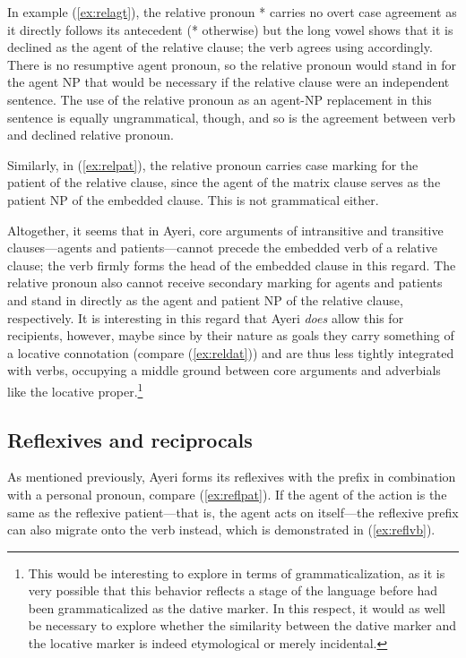 In example (\ref{ex:relagt}), the relative pronoun * carries 
no overt case agreement as it directly follows its antecedent 
(* otherwise) but the long vowel shows that it is declined 
as the agent of the relative clause; the verb agrees using  
accordingly. There is no resumptive agent pronoun, so the relative pronoun 
would stand in for the agent NP that would be necessary if the relative clause 
were an independent sentence. The use of the relative pronoun as an agent-NP 
replacement in this sentence is equally ungrammatical, though, and so is the 
agreement between verb and declined relative pronoun.

Similarly, in (\ref{ex:relpat}), the relative pronoun carries case marking for 
the patient of the relative clause, since the agent of the matrix clause serves 
as the patient NP of the embedded clause. This is not grammatical either.

Altogether, it seems that in Ayeri, core arguments of intransitive and 
transitive clauses---agents and patients---cannot precede the embedded verb of 
a relative clause; the verb firmly forms the head of the embedded clause in 
this regard. The relative pronoun also cannot receive secondary marking for 
agents and patients and stand in directly as the agent and patient NP of the 
relative clause, respectively. It is interesting in this regard that Ayeri 
\emph{does} allow this for recipients, however, maybe since by their nature as 
goals they carry something of a locative connotation (compare 
(\ref{ex:reldat})) and are thus less tightly integrated with verbs, occupying a 
middle ground between core arguments and adverbials like the locative 
proper.\footnote{This would be interesting to explore in terms of 
grammaticalization, as it is very possible that this behavior reflects a stage 
of the language before  had been grammaticalized as the dative 
marker. In this respect, it would as well be necessary to explore whether the 
similarity between the dative marker  and the locative marker 
 is indeed etymological or merely incidental.}


\subsection{Reflexives and reciprocals}
\label{subsec:reflrec}

As mentioned previously, Ayeri forms its reflexives with the prefix 
 in combination with a personal pronoun, compare 
(\ref{ex:reflpat}). If the agent of the action is the same as the reflexive 
patient---that is, the agent acts on itself---the reflexive prefix can also 
migrate onto the verb instead, which is demonstrated in (\ref{ex:reflvb}).

